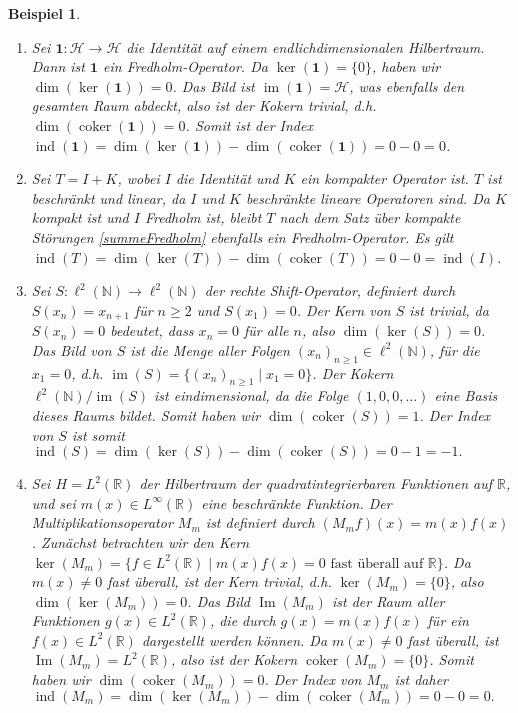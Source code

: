 \documentclass[11pt, hidelinks]{article}
\newcommand{\h}{\mathcal{H}}
\newcommand{\im}{\operatorname{im}}
\newcommand{\coker}{\operatorname{coker}}
\numberwithin{conj}{section}
\newtheorem{example}[conj]{Beispiel}
\begin{document}
\begin{example}\noindent
    \begin{enumerate}
        \item Sei $\mathbf{1}: \h \to \h$ die Identität auf einem endlichdimensionalen Hilbertraum. Dann ist $\mathbf{1}$ ein Fredholm-Operator. Da $\ker(\mathbf{1}) = \{0\}$, haben wir $\dim(\ker(\mathbf{1})) = 0$. Das Bild ist $\im(\mathbf{1}) = \h$, was ebenfalls den gesamten Raum abdeckt, also ist der Kokern trivial, d.h. $\dim(\operatorname{coker}(\mathbf{1})) = 0$. Somit ist der Index $\operatorname{ind}(\mathbf{1}) = \dim(\ker(\mathbf{1})) - \dim(\operatorname{coker}(\mathbf{1})) = 0 - 0 = 0$.
        \item Sei \( T = I + K \), wobei \( I \) die Identität und \( K \) ein kompakter Operator ist. \( T \) ist beschränkt und linear, da \( I \) und \( K \) beschränkte lineare Operatoren sind. Da \( K \) kompakt ist und \( I \) Fredholm ist, bleibt \( T \) nach dem Satz über kompakte Störungen \ref{summeFredholm} ebenfalls ein Fredholm-Operator. Es gilt $\operatorname{ind}(T) = \dim(\ker(T)) - \dim(\coker(T)) = 0 - 0 = \operatorname{ind}(I)$.
        \item Sei \( S: \ell^2(\mathbb{N}) \to \ell^2(\mathbb{N}) \) der rechte Shift-Operator, definiert durch \( S(x_n) = x_{n+1} \) für $n \geq 2$ und $S(x_1) = 0$. Der Kern von \( S \) ist trivial, da \( S(x_n) = 0 \) bedeutet, dass \( x_n = 0 \) für alle \( n \), also \( \dim(\ker(S)) = 0 \). Das Bild von \( S \) ist die Menge aller Folgen \( (x_n)_{n \geq 1} \in \ell^2(\mathbb{N}) \), für die \( x_1 = 0 \), d.h. \( \im(S) = \{ (x_n)_{n \geq 1} \mid x_1 = 0 \} \). Der Kokern \( \ell^2(\mathbb{N}) / \im(S) \) ist eindimensional, da die Folge \( (1, 0, 0, \dots) \) eine Basis dieses Raums bildet. Somit haben wir $\dim(\operatorname{coker}(S)) = 1$. Der Index von \( S \) ist somit $\operatorname{ind}(S) = \dim(\ker(S)) - \dim(\operatorname{coker}(S)) = 0 - 1 = -1.$
        \item Sei \( H = L^2(\mathbb{R}) \) der Hilbertraum der quadratintegrierbaren Funktionen auf \( \mathbb{R} \), und sei \( m(x) \in L^\infty(\mathbb{R}) \) eine beschränkte Funktion. Der Multiplikationsoperator \( M_m \) ist definiert durch \( (M_m f)(x) = m(x) f(x) \).  Zunächst betrachten wir den Kern \( \ker(M_m) = \{ f \in L^2(\mathbb{R}) \mid m(x) f(x) = 0 \text{ fast überall auf } \mathbb{R} \} \). Da \( m(x) \neq 0 \) fast überall, ist der Kern trivial, d.h. \( \ker(M_m) = \{0\} \), also \( \dim(\ker(M_m)) = 0 \). Das Bild \( \operatorname{Im}(M_m) \) ist der Raum aller Funktionen \( g(x) \in L^2(\mathbb{R}) \), die durch \( g(x) = m(x) f(x) \) für ein \( f(x) \in L^2(\mathbb{R}) \) dargestellt werden können. Da \( m(x) \neq 0 \) fast überall, ist \( \operatorname{Im}(M_m) = L^2(\mathbb{R}) \), also ist der Kokern \( \operatorname{coker}(M_m) = \{0\} \). Somit haben wir $\dim(\operatorname{coker}(M_m)) = 0$. Der Index von \( M_m \) ist daher $\operatorname{ind}(M_m) = \dim(\ker(M_m)) - \dim(\operatorname{coker}(M_m)) = 0 - 0 = 0.$
        \end{enumerate}
\end{example}

\singlespacing
\nocite{*}


\end{document}
